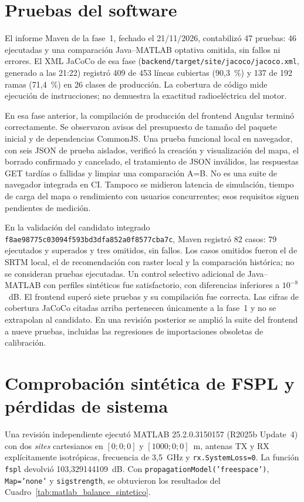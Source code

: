 \section{Pruebas del software}
\label{sec:resultados_web}

El informe Maven de la fase~1, fechado el 21/11/2026, contabilizó 47 pruebas: 46 ejecutadas y
una comparación Java--MATLAB optativa omitida, sin fallos ni errores. El XML JaCoCo de esa fase
(\texttt{backend/target/site/jacoco/jacoco.xml}, generado a las 21:22) registró 409 de
453 líneas cubiertas (90,3~\%) y 137 de 192 ramas (71,4~\%) en 26 clases de producción.
La cobertura de código mide ejecución de instrucciones; no demuestra la exactitud
radioeléctrica del motor.

En esa fase anterior, la compilación de producción del frontend Angular terminó correctamente. Se observaron
avisos del presupuesto de tamaño del paquete inicial y de dependencias CommonJS. Una
prueba funcional local en navegador, con seis JSON de prueba aislados, verificó la creación
y visualización del mapa, el borrado confirmado y cancelado, el tratamiento de JSON
inválidos, las respuestas GET tardías o fallidas y limpiar una comparación A=B. No es una
suite de navegador integrada en CI. Tampoco se midieron latencia de simulación, tiempo de
carga del mapa o rendimiento con usuarios concurrentes; esos requisitos siguen pendientes
de medición.

En la validación del candidato integrado \texttt{f8ae98775c03094f593bd3dfa852a0f8577cba7c},
Maven registró 82 casos: 79 ejecutados y superados y tres omitidos, sin fallos.
Los casos omitidos fueron el de SRTM local, el de recomendación con raster local y
la comparación histórica; no se consideran pruebas ejecutadas. Un control selectivo
adicional de Java--MATLAB con perfiles sintéticos fue satisfactorio, con diferencias
inferiores a $10^{-8}$~dB. El frontend superó siete pruebas y su compilación fue
correcta. Las cifras de cobertura JaCoCo citadas arriba pertenecen únicamente a la
fase~1 y no se extrapolan al candidato. En una revisión posterior se amplió la
suite del frontend a nueve pruebas, incluidas las regresiones de importaciones
obsoletas de calibración.

\section{Comprobación sintética de FSPL y pérdidas de sistema}
\label{sec:comprobacion_fspl_sintetica}

Una revisión independiente ejecutó MATLAB 25.2.0.3150157 (R2025b Update~4) con dos
\textit{sites} cartesianos en $[0;0;0]$ y $[1000;0;0]$~m, antenas TX y RX explícitamente
isotrópicas, frecuencia de 3,5~GHz y \texttt{rx.SystemLoss=0}. La función \texttt{fspl}
devolvió 103,329144109~dB. Con
\texttt{propagationModel('freespace')}, \texttt{Map='none'} y \texttt{sigstrength}, se
obtuvieron los resultados del Cuadro~\ref{tab:matlab_balance_sintetico}.

